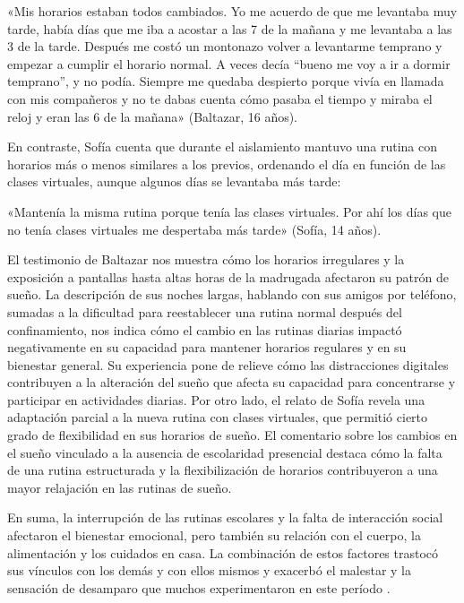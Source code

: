 \begin{refsection}
\begin{gbcita}
«Mis horarios estaban todos cambiados. Yo me acuerdo de que me levantaba muy tarde, había días que me iba a acostar a las 7 de la mañana y me levantaba a las 3 de la tarde. Después me costó un montonazo volver a levantarme temprano y empezar a cumplir el horario normal. A veces decía “bueno me voy a ir a dormir temprano”, y no podía. Siempre me quedaba despierto porque vivía en llamada con mis compañeros y no te dabas cuenta cómo pasaba el tiempo y miraba el reloj y eran las 6 de la mañana» (Baltazar, 16 años).

\end{gbcita}

En contraste, Sofía cuenta que durante el aislamiento mantuvo una rutina con horarios más o menos similares a los previos, ordenando el día en función de las clases virtuales, aunque algunos días se levantaba más tarde:


\begin{gbcita}
«Mantenía la misma rutina porque tenía las clases virtuales. Por ahí los días que no tenía clases virtuales me despertaba más tarde» (Sofía, 14 años).

\end{gbcita}

El testimonio de Baltazar nos muestra cómo los horarios irregulares y la exposición a pantallas hasta altas horas de la madrugada afectaron su patrón de sueño. La descripción de sus noches largas, hablando con sus amigos por teléfono, sumadas a la dificultad para reestablecer una rutina normal después del confinamiento, nos indica cómo el cambio en las rutinas diarias impactó negativamente en su capacidad para mantener horarios regulares y en su bienestar general. Su experiencia pone de relieve cómo las distracciones digitales contribuyen a la alteración del sueño que afecta su capacidad para concentrarse y participar en actividades diarias. Por otro lado, el relato de Sofía revela una adaptación parcial a la nueva rutina con clases virtuales, que permitió cierto grado de flexibilidad en sus horarios de sueño. El comentario sobre los cambios en el sueño vinculado a la ausencia de escolaridad presencial destaca cómo la falta de una rutina estructurada y la flexibilización de horarios contribuyeron a una mayor relajación en las rutinas de sueño.

En suma, la interrupción de las rutinas escolares y la falta de interacción social afectaron el bienestar emocional, pero también su relación con el cuerpo, la alimentación y los cuidados en casa. La combinación de estos factores trastocó sus vínculos con los demás y con ellos mismos y exacerbó el malestar y la sensación de desamparo que muchos experimentaron en este período \protect\parencite{4232-TUNON2022}.



\end{refsection}
